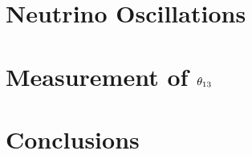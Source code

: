 \documentclass{ucbthesis}
\begin{document}
\listoftodos

\chapter{Neutrino Oscillations}












\chapter{Measurement of \texorpdfstring{$\theta_{13}$}{theta13}}
\label{ch:analysis}

\chapter{Conclusions}

\printbibliography

\appendix


\end{document}

